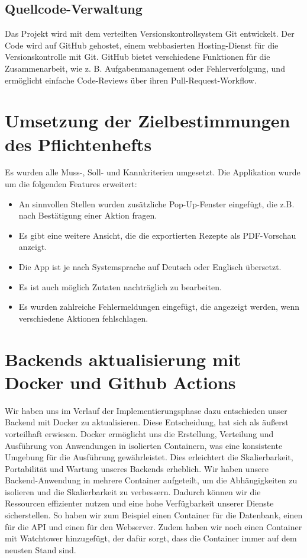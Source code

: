 \documentclass{implementierungsheft}
\begin{document}
\subsection{Quellcode-Verwaltung}
Das Projekt wird mit dem verteilten Versionskontrollsystem Git entwickelt. Der Code wird
auf GitHub gehostet, einem webbasierten Hosting-Dienst für die Versionskontrolle mit Git. GitHub bietet
verschiedene Funktionen für die Zusammenarbeit, wie z. B. Aufgabenmanagement oder Fehlerverfolgung, und ermöglicht einfache
Code-Reviews über ihren Pull-Request-Workflow.
\newpage

\section{Umsetzung der Zielbestimmungen des Pflichtenhefts} \label{sec:changes}
Es wurden alle Muss-, Soll- und Kannkriterien umgesetzt. Die Applikation wurde um die folgenden Features erweitert:
\begin{itemize}
    \item An sinnvollen Stellen wurden zusätzliche Pop-Up-Fenster eingefügt, die z.B. nach Bestätigung einer Aktion fragen.
    \item Es gibt eine weitere Ansicht, die die exportierten Rezepte als PDF-Vorschau anzeigt.
    \item Die App ist je nach Systemsprache auf Deutsch oder Englisch übersetzt.
    \item Es ist auch möglich Zutaten nachträglich zu bearbeiten.
    \item Es wurden zahlreiche Fehlermeldungen eingefügt, die angezeigt werden, wenn verschiedene Aktionen fehlschlagen.
\end{itemize}

\section{Backends aktualisierung mit Docker und Github Actions}
Wir haben uns im Verlauf der Implementierungsphase dazu entschieden unser Backend mit Docker zu aktualisieren.
Diese Entscheidung, hat sich als äußerst vorteilhaft erwiesen. Docker ermöglicht uns die Erstellung, Verteilung und Ausführung von Anwendungen in isolierten Containern, was eine konsistente Umgebung für die Ausführung gewährleistet. Dies erleichtert die Skalierbarkeit, Portabilität und Wartung unseres Backends erheblich.
Wir haben unsere Backend-Anwendung in mehrere Container aufgeteilt, um die Abhängigkeiten zu isolieren und die Skalierbarkeit zu verbessern. Dadurch können wir die Ressourcen effizienter nutzen und eine hohe Verfügbarkeit unserer Dienste sicherstellen.
So haben wir zum Beispiel einen Container für die Datenbank, einen für die API und einen für den Webserver.
Zudem haben wir noch einen Container mit Watchtower hinzugefügt, der dafür sorgt, dass die Container immer auf dem neusten Stand sind.
\end{document}
